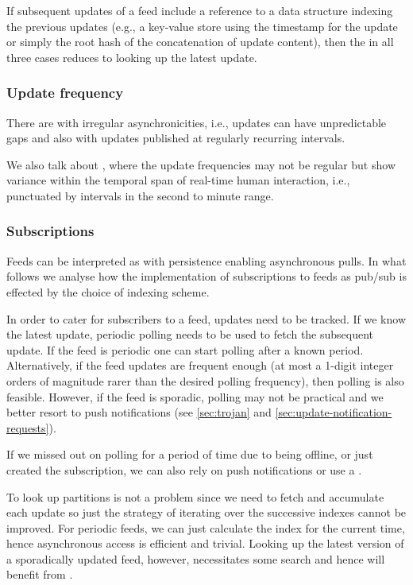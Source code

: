 If subsequent updates of a feed include a reference to a data structure indexing the previous updates (e.g., a key-value store using the timestamp for the update or simply the root hash of the concatenation of update content), then the  in all three cases reduces to looking up the latest update.

\subsubsection{Update frequency}

There are  with irregular asynchronicities, i.e., updates can have unpredictable gaps  and also  with updates published at regularly recurring intervals.

We also talk about , where the update frequencies may not be regular but show variance within the temporal span of real-time human interaction, i.e., punctuated by intervals in the second to minute range.

\subsubsection{Subscriptions}

Feeds can be interpreted as  with persistence enabling asynchronous pulls. In what follows we analyse how the implementation of subscriptions to feeds as pub/sub is effected by the choice of indexing scheme.

In order to cater for subscribers to a feed, updates need to be tracked. If we know the  latest update, periodic polling needs to be used to fetch the subsequent update. 
If the feed is periodic one can start polling after a known period. Alternatively, if the feed updates are frequent enough (at most a 1-digit integer orders of magnitude rarer than the desired polling frequency), then polling is also feasible.
However, if the feed is sporadic, polling may not be practical and we better resort to push notifications (see \ref{sec:trojan} and \ref{sec:update-notification-requests}).

If we missed out on polling for a period of time due to being offline, or just created the subscription, we can also rely on push notifications or use a . 

To look up partitions is not a problem since we need to fetch and accumulate each update so just the strategy of iterating over the  successive indexes cannot be improved.
For periodic feeds, we can just calculate the index for the current time, hence asynchronous access is efficient and trivial. 
Looking up the latest version of a sporadically updated feed, however, necessitates some search and hence 
will benefit from .



